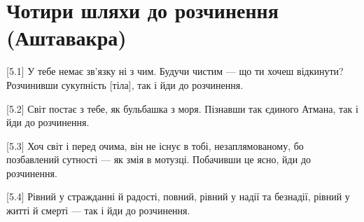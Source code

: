 \chapter[(Аштавакра)]{Чотири шляхи до розчинення (Аштавакра)}

[5.1] У тебе немає зв'язку ні з чим. Будучи чистим --- що ти хочеш відкинути? Розчинивши сукупність [тіла], так і йди до розчинення.

[5.2] Світ постає з тебе, як бульбашка з моря. Пізнавши так єдиного Атмана, так і йди до розчинення.

[5.3] Хоч світ і перед очима, він не існує в тобі, незаплямованому, бо позбавлений сутності --- як змія в мотузці. Побачивши це ясно, йди до розчинення.

[5.4] Рівний у стражданні й радості, повний, рівний у надії та безнадії, рівний у житті й смерті --- так і йди до розчинення.
